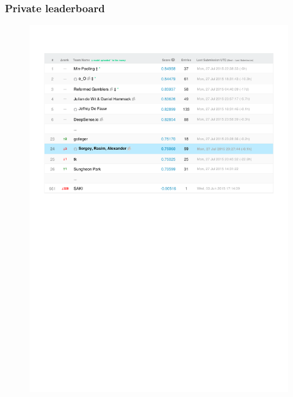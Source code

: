 \begin{frame}\frametitle{Private leaderboard} 
\vspace{-20pt}
\begin{center}
\begin{figure}
\includegraphics[width=\textwidth]{pics/private_lb_selected.pdf}
\end{figure}
\end{center}
\end{frame}



